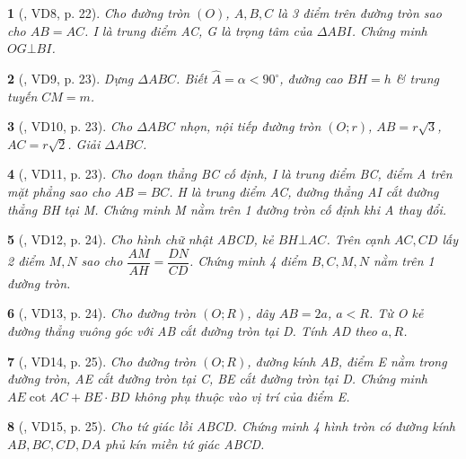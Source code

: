 \documentclass{article}
\newtheorem{baitoan}{}
\begin{document}
\begin{baitoan}[\cite{TLCT_THCS_Toan_9_hinh_hoc}, VD8, p. 22]
	Cho đường tròn $(O)$, $A,B,C$ là 3 điểm trên đường tròn sao cho $AB = AC$. I là trung điểm AC, G là trọng tâm của $\Delta ABI$. Chứng minh $OG\bot BI$.
\end{baitoan}

\begin{baitoan}[\cite{TLCT_THCS_Toan_9_hinh_hoc}, VD9, p. 23]
	Dựng $\Delta ABC$. Biết $\widehat{A} = \alpha < 90^\circ$, đường cao $BH = h$ \& trung tuyến $CM = m$.
\end{baitoan}

\begin{baitoan}[\cite{TLCT_THCS_Toan_9_hinh_hoc}, VD10, p. 23]
	Cho $\Delta ABC$ nhọn, nội tiếp đường tròn $(O;r)$, $AB = r\sqrt{3}$, $AC = r\sqrt{2}$. Giải $\Delta ABC$.
\end{baitoan}

\begin{baitoan}[\cite{TLCT_THCS_Toan_9_hinh_hoc}, VD11, p. 23]
	Cho đoạn thẳng BC cố định, I là trung điểm BC, điểm A trên mặt phẳng sao cho $AB = BC$. H là trung điểm AC, đường thẳng AI cắt đường thẳng BH tại M. Chứng minh M nằm trên 1 đường tròn cố định khi A thay đổi.
\end{baitoan}

\begin{baitoan}[\cite{TLCT_THCS_Toan_9_hinh_hoc}, VD12, p. 24]
	Cho hình chữ nhật ABCD, kẻ $BH\bot AC$. Trên cạnh $AC,CD$ lấy 2 điểm $M,N$ sao cho $\dfrac{AM}{AH} = \dfrac{DN}{CD}$. Chứng minh 4 điểm $B,C,M,N$ nằm trên 1 đường tròn.
\end{baitoan}

\begin{baitoan}[\cite{TLCT_THCS_Toan_9_hinh_hoc}, VD13, p. 24]
	Cho đường tròn $(O;R)$, dây $AB = 2a$, $a < R$. Từ O kẻ đường thẳng vuông góc với AB cắt đường tròn tại D. Tính AD theo $a,R$.
\end{baitoan}

\begin{baitoan}[\cite{TLCT_THCS_Toan_9_hinh_hoc}, VD14, p. 25]
	Cho đường tròn $(O;R)$, đường kính AB, điểm E nằm trong đường tròn, AE cắt đường tròn tại C, BE cắt đường tròn tại D. Chứng minh $AE\cot AC + BE\cdot BD$ không phụ thuộc vào vị trí của điểm E.
\end{baitoan}

\begin{baitoan}[\cite{TLCT_THCS_Toan_9_hinh_hoc}, VD15, p. 25]
	Cho tứ giác lồi ABCD. Chứng minh 4 hình tròn có đường kính $AB,BC,CD,DA$ phủ kín miền tứ giác ABCD.
\end{baitoan}
\end{document}

